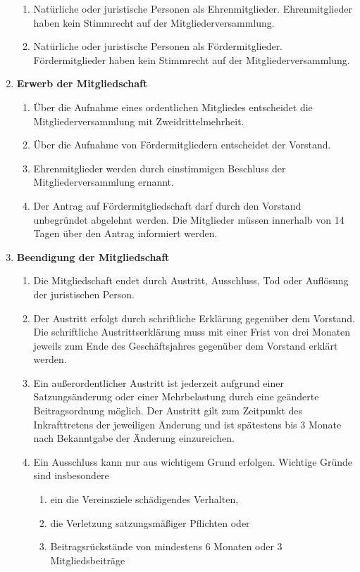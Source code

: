 \documentclass[german]{article}
\newcommand{\paragr}[1]{\item \textsf{\textbf{#1}}}
\begin{document}
\begin{enumerate}
\begin{enumerate}
\item Natürliche oder juristische Personen als Ehrenmitglieder. Ehrenmitglieder haben kein Stimmrecht auf der Mitgliederversammlung.

\item Natürliche oder juristische Personen als Fördermitglieder. Fördermitglieder haben kein Stimmrecht auf der Mitgliederversammlung.
\end{enumerate}


\paragr{Erwerb der Mitgliedschaft}
\begin{enumerate}

\item Über die Aufnahme eines ordentlichen Mitgliedes entscheidet die Mitgliederversammlung mit Zweidrittelmehrheit.

\item Über die Aufnahme von Fördermitgliedern entscheidet der Vorstand.

\item Ehrenmitglieder werden durch einstimmigen Beschluss der Mitgliederversammlung ernannt.

\item Der Antrag auf Fördermitgliedschaft darf durch den Vorstand unbegründet abgelehnt werden.
Die Mitglieder müssen innerhalb von 14 Tagen über den Antrag informiert werden.

\end{enumerate}


\paragr{Beendigung der Mitgliedschaft}
\begin{enumerate}

\item Die Mitgliedschaft endet durch Austritt, Ausschluss, Tod oder Auflösung der juristischen Person.

\item Der Austritt erfolgt durch schriftliche Erklärung gegenüber dem Vorstand.
Die schriftliche Austrittserklärung muss mit einer Frist von drei Monaten jeweils zum Ende des Geschäftsjahres gegenüber dem Vorstand erklärt werden.

\item Ein außerordentlicher Austritt ist jederzeit aufgrund einer Satzungsänderung oder einer Mehrbelastung durch eine geänderte Beitragsordnung möglich.
Der Austritt gilt zum Zeitpunkt des Inkrafttretens der jeweiligen Änderung und ist spätestens bis 3 Monate nach Bekanntgabe der Änderung einzureichen.

\item Ein Ausschluss kann nur aus wichtigem Grund erfolgen.
Wichtige Gründe sind insbesondere
\begin{enumerate}
\item ein die Vereinsziele schädigendes Verhalten,
\item die Verletzung satzungsmäßiger Pflichten oder
\item Beitragsrückstände von mindestens 6 Monaten oder 3 Mitgliedsbeiträge
\end{enumerate}


\end{enumerate}
\end{enumerate}
\end{document}
